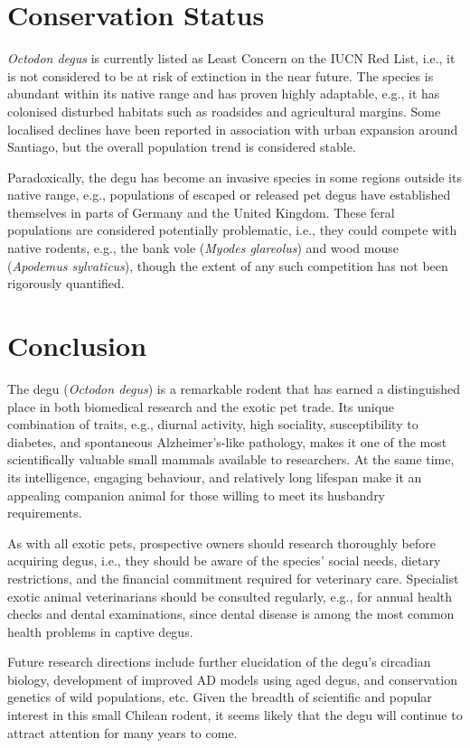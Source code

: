 \documentclass[12pt,a4paper]{article}
\begin{document}
\section{Conservation Status}

\textit{Octodon degus} is currently listed as Least Concern on the IUCN Red List, i.e., it is not considered to be at risk of extinction in the near future.
The species is abundant within its native range and has proven highly adaptable, e.g., it has colonised disturbed habitats such as roadsides and agricultural margins.
Some localised declines have been reported in association with urban expansion around Santiago, but the overall population trend is considered stable.

Paradoxically, the degu has become an invasive species in some regions outside its native range, e.g., populations of escaped or released pet degus have established themselves in parts of Germany and the United Kingdom.
These feral populations are considered potentially problematic, i.e., they could compete with native rodents, e.g., the bank vole (\textit{Myodes glareolus}) and wood mouse (\textit{Apodemus sylvaticus}), though the extent of any such competition has not been rigorously quantified.

\section{Conclusion}

The degu (\textit{Octodon degus}) is a remarkable rodent that has earned a distinguished place in both biomedical research and the exotic pet trade.
Its unique combination of traits, e.g., diurnal activity, high sociality, susceptibility to diabetes, and spontaneous Alzheimer's-like pathology, makes it one of the most scientifically valuable small mammals available to researchers.
At the same time, its intelligence, engaging behaviour, and relatively long lifespan make it an appealing companion animal for those willing to meet its husbandry requirements.

As with all exotic pets, prospective owners should research thoroughly before acquiring degus, i.e., they should be aware of the species' social needs, dietary restrictions, and the financial commitment required for veterinary care.
Specialist exotic animal veterinarians should be consulted regularly, e.g., for annual health checks and dental examinations, since dental disease is among the most common health problems in captive degus.

Future research directions include further elucidation of the degu's circadian biology, development of improved AD models using aged degus, and conservation genetics of wild populations, etc.
Given the breadth of scientific and popular interest in this small Chilean rodent, it seems likely that the degu will continue to attract attention for many years to come.
\end{document}
